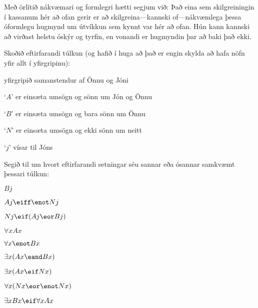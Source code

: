 Með örlítið nákvæmari og formlegri hætti segjum við:
Það eina sem skilgreiningin í kassanum hér að ofan gerir er að skilgreina---kannski of---nákvæmlega þessa óformlegu hugmynd um útvíkkun sem kynnt var hér að ofan. Hún kann kannski að virðast helstu óskýr og tyrfin, en vonandi er hugmyndin þar að baki það ekki.

\practiceproblems
\problempart
\label{pr.TorF1}
Skoðið eftirfarandi túlkun (og hafið í huga að það er engin skylda að hafa nöfn yfir allt í yfirgripinu):
	\begin{ebullet}
		\item yfirgripið samanstendur af Önnu og Jóni
		\item `$A$' er einsæta umsögn og sönn um Jón og Önnu
		\item `$B$' er einsæta umsögn og bara sönn um Önnu
		\item `$N$' er einsæta umsögn og ekki sönn um neitt
		\item `$j$' vísar til Jóns
	\end{ebullet}
Segið til um hvort eftirfarandi setningar séu sannar eða ósannar samkvæmt þessari túlkun:
\begin{earg}
\item $Bj$
\item $Aj \eiff \enot Nj$
\item $Nj \eif (Aj \eor Bj)$
\item $\forall x Ax$
\item $\forall x \enot Bx$
\item $\exists x(Ax \eand Bx)$
\item $\exists x(Ax \eif Nx)$
\item $\forall x(Nx \eor \enot Nx)$
\item $\exists x Bx \eif \forall x Ax$
\end{earg}

